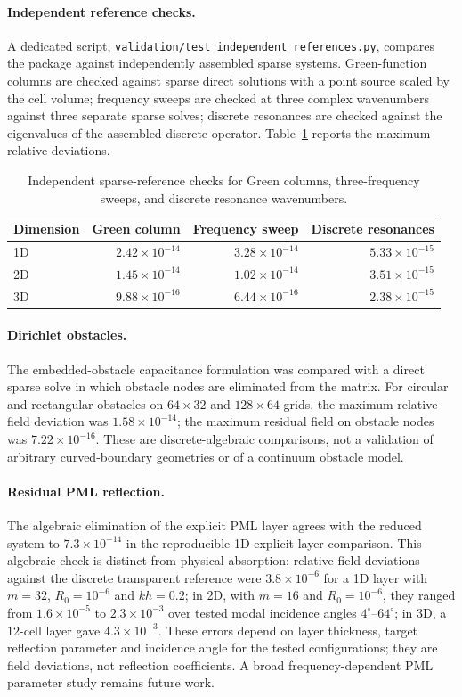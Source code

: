 \documentclass[preprint,12pt,a4paper]{elsarticle}
\begin{document}
\paragraph{Independent reference checks.}
A dedicated script, \texttt{validation/test\_independent\_references.py}, compares the package against independently assembled sparse systems. Green-function columns are checked against sparse direct solutions with a point source scaled by the cell volume; frequency sweeps are checked at three complex wavenumbers against three separate sparse solves; discrete resonances are checked against the eigenvalues of the assembled discrete operator. Table~\ref{tab:independent} reports the maximum relative deviations.
\begin{table}[t]
\centering\small
\begin{tabular}{@{}lrrr@{}}
\toprule
Dimension & Green column & Frequency sweep & Discrete resonances\\
\midrule
1D & $2.42\times10^{-14}$ & $3.28\times10^{-14}$ & $5.33\times10^{-15}$\\
2D & $1.45\times10^{-14}$ & $1.02\times10^{-14}$ & $3.51\times10^{-15}$\\
3D & $9.88\times10^{-16}$ & $6.44\times10^{-16}$ & $2.38\times10^{-15}$\\
\bottomrule
\end{tabular}
\caption{Independent sparse-reference checks for Green columns, three-frequency sweeps, and discrete resonance wavenumbers.}
\label{tab:independent}
\end{table}
\paragraph{Dirichlet obstacles.}
The embedded-obstacle capacitance formulation was compared with a direct sparse solve in which obstacle nodes are eliminated from the matrix. For circular and rectangular obstacles on $64\times32$ and $128\times64$ grids, the maximum relative field deviation was $1.58\times10^{-14}$; the maximum residual field on obstacle nodes was $7.22\times10^{-16}$. These are discrete-algebraic comparisons, not a validation of arbitrary curved-boundary geometries or of a continuum obstacle model.
\paragraph{Residual PML reflection.}
The algebraic elimination of the explicit PML layer agrees with the reduced system to $7.3\times10^{-14}$ in the reproducible 1D explicit-layer comparison. This algebraic check is distinct from physical absorption: relative field deviations against the discrete transparent reference were $3.8\times10^{-6}$ for a 1D layer with $m=32$, $R_0=10^{-6}$ and $kh=0.2$; in 2D, with $m=16$ and $R_0=10^{-6}$, they ranged from $1.6\times10^{-5}$ to $2.3\times10^{-3}$ over tested modal incidence angles $4^\circ$--$64^\circ$; in 3D, a $12$-cell layer gave $4.3\times10^{-3}$. These errors depend on layer thickness, target reflection parameter and incidence angle for the tested configurations; they are field deviations, not reflection coefficients. A broad frequency-dependent PML parameter study remains future work.
\end{document}
